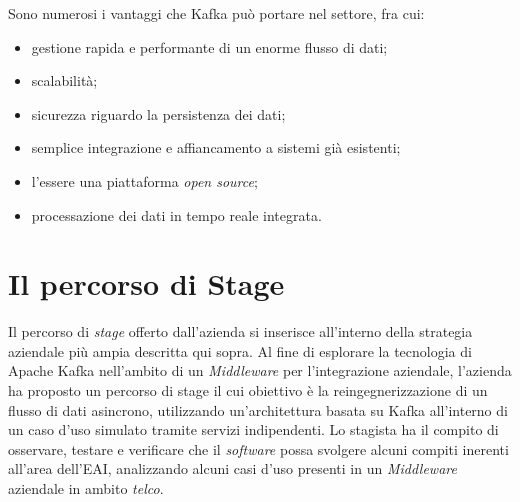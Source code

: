 \bigskip\noindent
Sono numerosi i vantaggi che Kafka può portare nel settore, fra cui:
\begin{itemize}
  \item gestione rapida e performante di un enorme flusso di dati;
  \item scalabilità;
  \item sicurezza riguardo la persistenza dei dati;
  \item semplice integrazione e affiancamento a sistemi già esistenti;
  \item l'essere una piattaforma \textit{open source};
  \item processazione dei dati in tempo reale integrata.
\end{itemize}


\section{Il percorso di Stage}


%
%

Il percorso di \textit{stage} offerto dall'azienda si inserisce all'interno della strategia aziendale più ampia descritta qui sopra.
Al fine di esplorare la tecnologia di Apache Kafka nell'ambito di un \textit{Middleware} per l'integrazione aziendale, l'azienda ha proposto un percorso di stage il cui obiettivo è la reingegnerizzazione di un flusso di dati asincrono, utilizzando un'architettura basata su Kafka all'interno di un caso d'uso simulato tramite servizi indipendenti.
Lo stagista ha il compito di osservare, testare e verificare che il \textit{software} possa svolgere alcuni compiti inerenti all'area dell'EAI, analizzando alcuni casi d'uso presenti in un \textit{Middleware} aziendale in ambito \textit{telco}.

